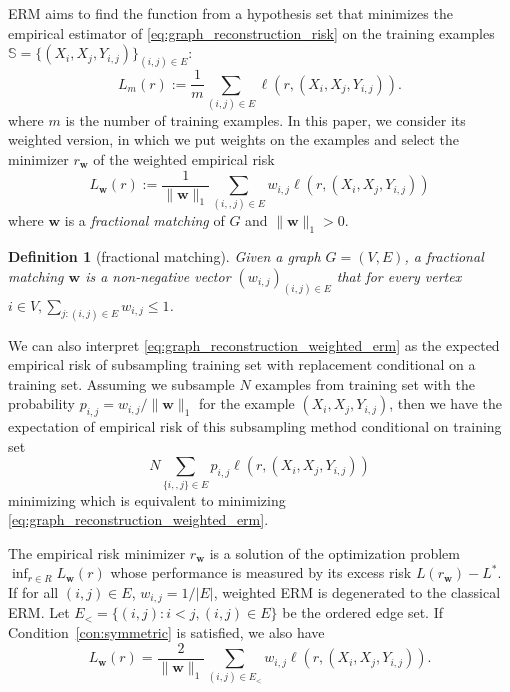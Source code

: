 \documentclass[letterpaper]{article} %
\def\LongVersion{}
\def\LongVersionEnd{}
\newtheorem{definition}{Definition}
\newcommand{\weight}{\mathbf{w}}
\newcommand{\bayeserror}{L^*}
\newcommand{\empiricalrisk}[1]{L_{#1}}
\newcommand{\lossf}{\ell}
\newcommand{\pair}[1]{(#1)}
\newcommand{\normo}[1]{\|#1\|_1}
\newcommand{\trainingset}{\mathbb{S}}
\begin{document}
ERM aims to find the function from a hypothesis set that minimizes the empirical estimator of \eqref{eq:graph_reconstruction_risk} on the training examples $\trainingset{}=\{(X_i,X_j,Y_{i,j})\}_{\pair{i,j}\in E}$:
\begin{equation}
    \label{eq:graph_reconstruction_non_weighted_erm}
    \empiricalrisk{m}(r) := \frac{1}{m}\sum_{\pair{i,j}\in E} \lossf(r, (X_i,X_j, Y_{i,j})).
\end{equation}
where $m$ is the number of training examples. 
In this paper, we consider its weighted version, in which we put weights on the examples and select the minimizer $r_\weight{}$ of the weighted empirical risk
\begin{equation}
    \label{eq:graph_reconstruction_weighted_erm}
    \empiricalrisk{\weight}(r) := \frac{1}{\normo{\weight}} \sum_{\pair{i,,j}\in E} w_{i,j} \lossf(r, (X_i,X_j, Y_{i,j}))
\end{equation}
where $\weight$ is a \emph{fractional matching} of $G$ and $\normo{\weight{}} > 0$. 
\begin{definition}[fractional matching]
Given a graph $G=(V,E)$, a \emph{fractional matching} $\weight$ is a non-negative 
vector $(w_{i,j})_{\pair{i,j}\in E}$ that for every vertex $i\in V, \sum_{j:\pair{i,j}\in E}w_{i,j}\le 1$.
\end{definition}

\LongVersion
We can also interpret \eqref{eq:graph_reconstruction_weighted_erm} as the expected empirical risk of subsampling training set with replacement conditional on a training set.
Assuming we subsample $N$ examples from training set with the probability $p_{i,j}=w_{i,j}/\normo{\weight{}}$ for the example $(X_i,X_j,Y_{i,j})$, then we have the expectation of empirical risk of this subsampling method conditional on training set
\begin{equation}
    \label{eq:subsampling_erm}
    N\sum_{\{i,,j\}\in E} p_{i,j} \lossf(r, (X_i,X_j, Y_{i,j}))
\end{equation}
minimizing which is equivalent to minimizing \eqref{eq:graph_reconstruction_weighted_erm}.
\LongVersionEnd

\LongVersion
The empirical risk minimizer $r_\weight{}$ is a solution of the optimization problem $\inf_{r\in R}L_\weight{}(r)$ whose performance is measured by its excess risk $L(r_\weight{})-\bayeserror{}$.
If for all $\pair{i,j}\in E$, $w_{i,j}=1/|E|$, weighted ERM is degenerated to the classical ERM.
Let $E_<=\{\pair{i,j}: i<j, \pair{i,j}\in E\}$ be the ordered edge set. If Condition~\ref{con:symmetric} is satisfied, we also have
\begin{equation}
    \label{eq:symmetric_graph_reconstruction_imcomplete_erm}
    \empiricalrisk{\weight{}}(r) = \frac{2}{\normo{\weight{}}} \sum_{\pair{i,j}\in E_<} w_{i,j} \lossf(r, (X_i,X_j, Y_{i,j})).
\end{equation}
\LongVersionEnd
\end{document}
